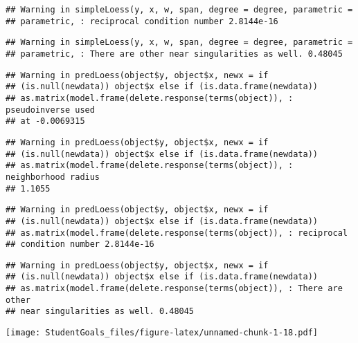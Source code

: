 \documentclass[]{article}
\begin{document}
\begin{verbatim}
## Warning in simpleLoess(y, x, w, span, degree = degree, parametric =
## parametric, : reciprocal condition number 2.8144e-16
\end{verbatim}

\begin{verbatim}
## Warning in simpleLoess(y, x, w, span, degree = degree, parametric =
## parametric, : There are other near singularities as well. 0.48045
\end{verbatim}

\begin{verbatim}
## Warning in predLoess(object$y, object$x, newx = if
## (is.null(newdata)) object$x else if (is.data.frame(newdata))
## as.matrix(model.frame(delete.response(terms(object)), : pseudoinverse used
## at -0.0069315
\end{verbatim}

\begin{verbatim}
## Warning in predLoess(object$y, object$x, newx = if
## (is.null(newdata)) object$x else if (is.data.frame(newdata))
## as.matrix(model.frame(delete.response(terms(object)), : neighborhood radius
## 1.1055
\end{verbatim}

\begin{verbatim}
## Warning in predLoess(object$y, object$x, newx = if
## (is.null(newdata)) object$x else if (is.data.frame(newdata))
## as.matrix(model.frame(delete.response(terms(object)), : reciprocal
## condition number 2.8144e-16
\end{verbatim}

\begin{verbatim}
## Warning in predLoess(object$y, object$x, newx = if
## (is.null(newdata)) object$x else if (is.data.frame(newdata))
## as.matrix(model.frame(delete.response(terms(object)), : There are other
## near singularities as well. 0.48045
\end{verbatim}

\texttt{[image: StudentGoals\_files/figure-latex/unnamed-chunk-1-18.pdf]}
\end{document}
